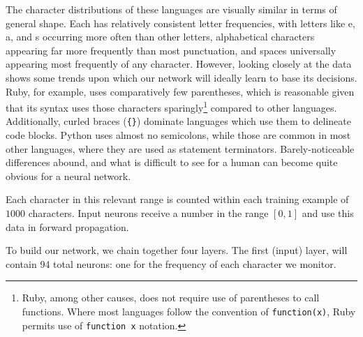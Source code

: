 \documentclass{article}
\begin{document}
\begin{center}
\end{center}
The character distributions of these languages are visually similar in terms of general shape. Each has relatively consistent letter frequencies, with letters like e, a, and s occurring more often than other letters, alphabetical characters appearing far more frequently than most punctuation, and spaces universally appearing most frequently of any character. However, looking closely at the data shows some trends upon which our network will ideally learn to base its decisions. Ruby, for example, uses comparatively few parentheses, which is reasonable given that its syntax uses those characters sparingly\footnote{Ruby, among other causes, does not require use of parentheses to call functions. Where most languages follow the convention of \texttt{function(x)}, Ruby permits use of \texttt{function x} notation.} compared to other languages. Additionally, curled braces (\texttt{\{\}}) dominate languages which use them to delineate code blocks. Python uses almost no semicolons, while those are common in most other languages, where they are used as statement terminators. Barely-noticeable differences abound, and what is difficult to see for a human can become quite obvious for a neural network.

Each character in this relevant range is counted within each training example of $1000$ characters. Input neurons receive a number in the range $[0,1]$ and use this data in forward propagation.

To build our network, we chain together four layers. The first (input) layer, will contain 94 total neurons: one for the frequency of each character we monitor.
\end{document}
